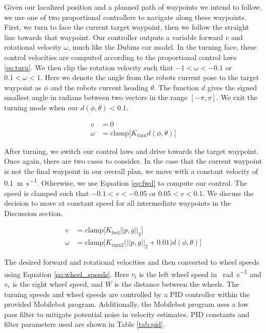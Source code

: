 \documentclass[journal]{IEEEtran}
\begin{document}
            Given our localized position and a planned path of waypoints we intend to follow, we use one of two proportional controllers to navigate along these waypoints. First, we turn to face the current target waypoint, then we follow the straight line towards that waypoint. Our controller outputs a variable forward $v$ and rotational velocity $\omega$, much like the Dubins car model. In the turning face, these control velocities are computed according to the proportional control laws \eqref{eq:turn}. We then clip the rotation velocity such that $-1 < \omega < -0.1$ or $0.1 < \omega < 1$. Here we denote the angle from the robots current pose to the target waypoint as $\phi$ and the robots current heading $\theta$. The function $d$ gives the signed smallest angle in radians between two vectors in the range $[-\pi,\pi]$. We exit the turning mode when our $d(\phi,\theta) < 0.1$.
            
            \begin{equation} \label{eq:turn}
                \begin{split}
                 v &= 0 \\
                 \omega &= \text{clamp}\Big[K_\text{turn}d(\phi,\theta)\Big]
                \end{split}
            \end{equation}
            
            After turning, we switch our control laws and drive towards the target waypoint. Once again, there are two cases to consider. In the case that the current waypoint is not the final waypoint in our overall plan, we move with a constant velocity of \SI{0.1}{\meter\per\second}. Otherwise, we use Equation \eqref{eq:fwd} to compute our control. The speed is clamped such that $-0.1 < v < -0.05$ or $0.05 < v < 0.1$. We discuss the decision to move at constant speed for all intermediate waypoints in the Discussion section.
            
            \begin{equation} \label{eq:fwd}
                \begin{split}
                 v &=  \text{clamp}\Big[K_\text{fwd}||p, g||_2\Big] \\
                 \omega &= \text{clamp}\Big[K_\text{turn2}\big(||p, g||_2+0.01\big)d(\phi,\theta)\Big]
                \end{split}
            \end{equation}
            
            The desired forward and rotational velocities and then converted to wheel speeds using Equation \eqref{eq:wheel_speeds}. Here $v_l$ is the left wheel speed in \SI{}{\radian\per\second} and $v_r$ is the right wheel speed, and $W$ is the distance between the wheels. The turning speeds and wheel speeds are controlled by a PID controller within the provided Mobilebot program. Additionally, the Mobilebot program uses a low pass filter to mitigate potential noise in velocity estimates. PID constants and filter parameters used are shown in Table \ref{tab:pid}.
            
\end{document}
